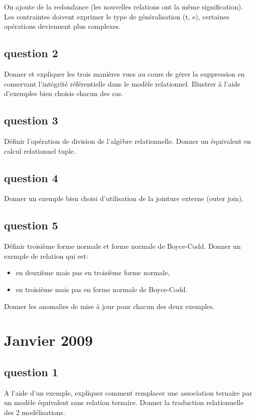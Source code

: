 On ajoute de la redondance (les nouvelles relations ont la m\^eme signification).
Les contraintes doivent exprimer le type de généralisation (t, e), 
certaines opérations deviennent plus complexes.


\subsection{question 2}
	Donner et expliquer les trois manières vues au cours de gérer la suppression en conservant l'intégrité référentielle dans le modèle relationnel. Illustrer à l'aide d'exemples bien choisis chacun des cas.



\subsection{question 3}
	Définir l'opération de division de l'algèbre relationnelle. Donner un équivalent en calcul relationnel tuple.
\subsection{question 4}
Donner un exemple bien choisi d’utilisation de la jointure externe (outer join).

\subsection{question 5}
Définir troisième forme normale et forme normale de Boyce-Codd.
Donner un exemple de relation qui est:
\begin{itemize}
	\item en deuxième mais pas en troisième forme normale,
	\item en troisième mais pas en forme normale de Boyce-Codd.
\end{itemize}
Donner les anomalies de mise à jour pour chacun des deux exemples.


\section{Janvier 2009}

\subsection{question 1}
A l’aide d’un exemple, expliquer comment remplacer une association ternaire par un modèle
équivalent sans relation ternaire. Donner la traduction relationnelle des 2 modélisations.

